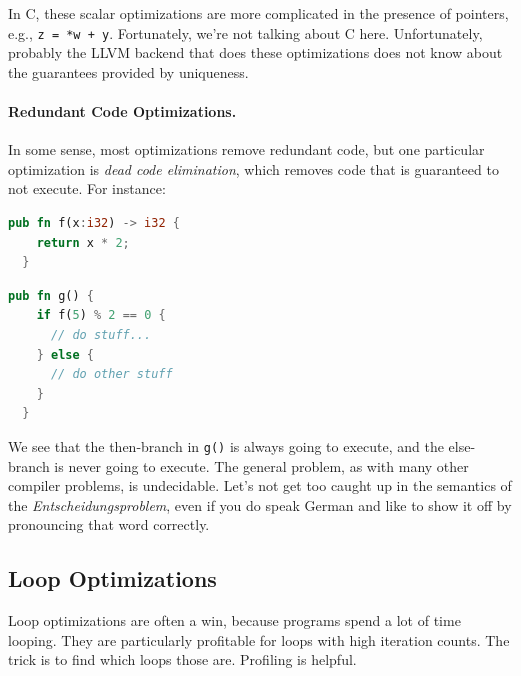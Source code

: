 In C, these scalar optimizations are more complicated in the presence
of pointers, e.g., {\tt z = *w + y}. Fortunately, we're not talking about C here.
Unfortunately, probably the LLVM backend that does these optimizations does not know about
the guarantees provided by uniqueness.


\paragraph{Redundant Code Optimizations.} In some sense, most optimizations
remove redundant code, but one particular optimization is \emph{dead code
elimination}, which removes code that is guaranteed to not execute.
For instance:

{\scriptsize
\begin{center}
\vspace*{-2em}
\begin{minipage}{.3\textwidth}
\begin{lstlisting}[language=Rust]
  pub fn f(x:i32) -> i32 {
    return x * 2;
  }
  \end{lstlisting}
  \end{minipage} \begin{minipage}{.3\textwidth}
\begin{lstlisting}[language=Rust]
  pub fn g() {
    if f(5) % 2 == 0 {
      // do stuff...
    } else {
      // do other stuff
    }
  }
\end{lstlisting}
\end{minipage}
\end{center}
}
We see that the then-branch in {\tt g()} is always going to execute, and the
else-branch is never going to execute.
The general problem, as with many other compiler problems, is undecidable. Let's not get too caught up in the semantics of the \textit{Entscheidungsproblem}, even if you do speak German and like to show it off by pronouncing that word correctly.

\subsection*{Loop Optimizations}
Loop optimizations are often a win, because programs spend a lot of time looping. They are particularly profitable for loops with high iteration counts.
The trick is to find which loops those are.
Profiling is helpful.

